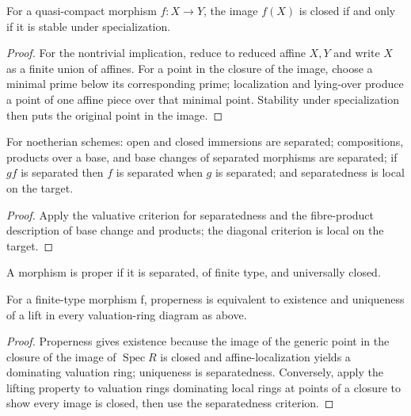 \begin{lemma}
\label{lem:II-4-5}
For a quasi-compact morphism $f:X\to Y$, the image $f(X)$ is closed if and only if it is stable
under specialization.
\end{lemma}
\begin{proof}
For the nontrivial implication, reduce to reduced affine $X,Y$ and write $X$ as a finite union of
affines. For a point in the closure of the image, choose a minimal prime below its corresponding
prime; localization and lying-over produce a point of one affine piece over that minimal point.
Stability under specialization then puts the original point in the image.
\end{proof}

\begin{corollary}
\label{cor:II-4-6}
For noetherian schemes: open and closed immersions are separated; compositions, products over a
base, and base changes of separated morphisms are separated; if $gf$ is separated then $f$ is
separated when $g$ is separated; and separatedness is local on the target.
\end{corollary}
\begin{proof}
Apply the valuative criterion for separatedness and the fibre-product description of base change
and products; the diagonal criterion is local on the target.
\end{proof}

\begin{definition}
\label{def:II-4-proper}
A morphism is proper if it is separated, of finite type, and universally closed.
\end{definition}

\begin{theorem}
\label{thm:II-4-7}
For a finite-type morphism f, properness is equivalent to existence and uniqueness of a lift in every
valuation-ring diagram as above.
\end{theorem}
\begin{proof}
Properness gives existence because the image of the generic point in the closure of the image of
$\operatorname{Spec}R$ is closed and affine-localization yields a dominating valuation ring; uniqueness
is separatedness. Conversely, apply the lifting property to valuation rings dominating local rings
at points of a closure to show every image is closed, then use the separatedness criterion.
\end{proof}


